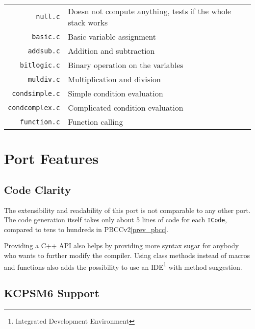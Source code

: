            \begin{center}
            \begin{tabular}{ r | l }
                \texttt{null.c} & Doesn not compute anything, tests if the whole stack works \\
                \texttt{basic.c} & Basic variable assignment \\
                \texttt{addsub.c} & Addition and subtraction \\
                \texttt{bitlogic.c} & Binary operation on the variables \\
                \texttt{muldiv.c} & Multiplication and division \\
                \texttt{condsimple.c} & Simple condition evaluation \\
                \texttt{condcomplex.c} & Complicated condition evaluation \\
                \texttt{function.c} & Function calling \\
            \end{tabular}
            \end{center}

\chapter{Port Features}\label{features}

    \section{Code Clarity}

    The extensibility and readability of this port is not comparable to any other port. The code generation itself takes only about 5 lines of code for each \texttt{ICode}, compared to tens to hundreds in PBCCv2\ref{prev_pbcc}.

    Providing a C++ API also helps by providing more syntax sugar for anybody who wants to further modify the compiler. Using class methods instead of macros and functions also adds the possibility to use an IDE\footnote{Integrated Development Environment} with method suggestion.

    \section{KCPSM6 Support}

